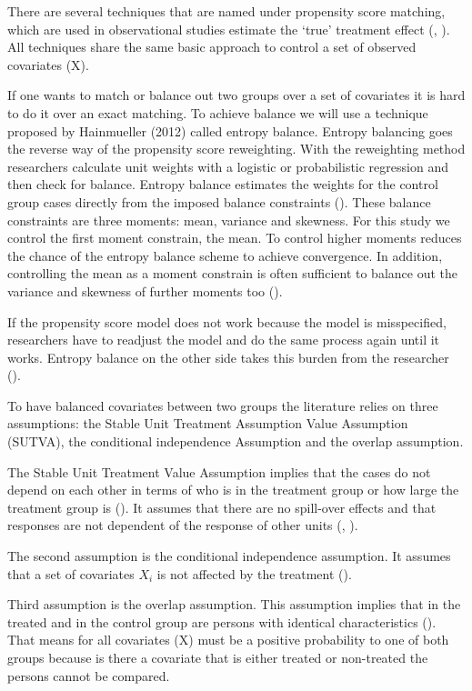 There are several techniques that are named under propensity score matching, which are used in observational studies estimate the `true' treatment effect (\cite{Altonjietal05}, \cite{Morgan01}). All techniques share the same basic approach to control a set of observed covariates (X).

If one wants to match or balance out two groups over a set of covariates it is hard to do it over an exact matching. To achieve balance we will use a technique proposed by Hainmueller (2012) called entropy balance. Entropy balancing goes the reverse way of the propensity score reweighting. With the reweighting method researchers calculate unit weights with a logistic or probabilistic regression and then check for balance. Entropy balance estimates the weights for the control group cases directly from the imposed balance constraints (\cite{Hainmueller12}). These balance constraints are three moments: mean, variance and skewness. For this study we control the first moment constrain, the mean. To control higher moments reduces the chance of the entropy balance scheme to achieve convergence. In addition, controlling the mean as a moment constrain is often sufficient to balance out the variance and skewness of further moments too (\cite{Hainmueller etal13}).

If the propensity score model does not work because the model is misspecified, researchers have to readjust the model and do the same process again until it works. Entropy balance on the other side takes this burden from the researcher (\cite{Hainmueller12}).

To have balanced covariates between two groups the literature relies on three assumptions: the Stable Unit Treatment Assumption Value Assumption (SUTVA), the conditional independence Assumption and the overlap assumption.

The Stable Unit Treatment Value Assumption implies that the cases do not depend on each other in terms of who is in the treatment group or how large the treatment group is (\cite{Eckmanetal15}). It assumes that there are no spill-over effects and that responses are not dependent of the response of other units (\cite{Rubin80}, \cite{Holland86}).

The second assumption is the conditional independence assumption. It assumes that a set of covariates \(X_{i}\) is not affected by the treatment (\cite{Caliendoetal05}).

Third assumption is the overlap assumption. This assumption implies that in the treated and in the control group are persons with identical characteristics (\cite{Heckmanetal98}). That means for all covariates (X) must be a positive probability to one of both groups because is there a covariate that is either treated or non-treated the persons cannot be compared.

